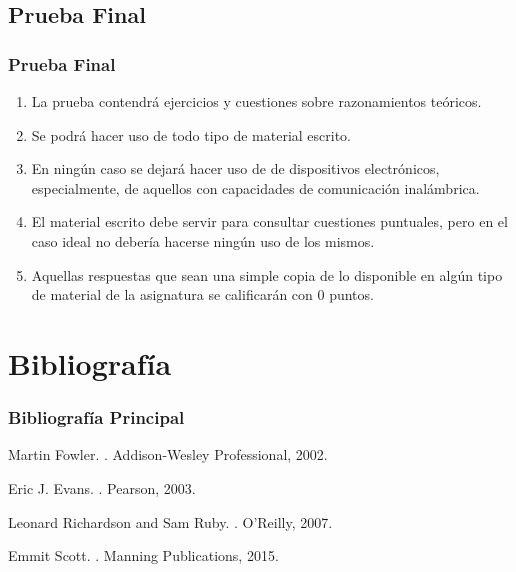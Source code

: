 \documentclass[handout,a4paper,t,xcolor=pst,colortheme]{beamer}
\begin{document}
\subsection{Prueba Final}

\begin{frame}[c]
    \frametitle{Prueba Final}
	\begin{enumerate}[<+->]
		\item La prueba contendrá ejercicios y cuestiones sobre razonamientos teóricos.
        \item Se podrá hacer uso de todo tipo de material escrito.
        \item En ningún caso se dejará hacer uso de de dispositivos electrónicos, especialmente, de aquellos con capacidades de comunicación inalámbrica.
		\item \alert{El material escrito debe servir para consultar cuestiones puntuales, pero en el caso ideal no debería hacerse ningún uso de los mismos}.
		\item Aquellas respuestas que sean una simple copia de lo disponible en algún tipo de material de la asignatura se calificarán con 0 puntos.
	\end{enumerate}
\end{frame}

\section{Bibliografía}

\begin{frame}[c]
	\frametitle{Bibliografía Principal}
    \begin{thebibliography}{1}

Martin Fowler.
.
\newblock Addison-Wesley Professional, 2002.

Eric J. Evans.
.
\newblock Pearson, 2003.

Leonard Richardson and Sam Ruby.
.
\newblock  O'Reilly, 2007.

\bibitem{}
Emmit Scott.
.
\newblock  Manning Publications, 2015.

\end{thebibliography}
\end{frame}
\end{document}
